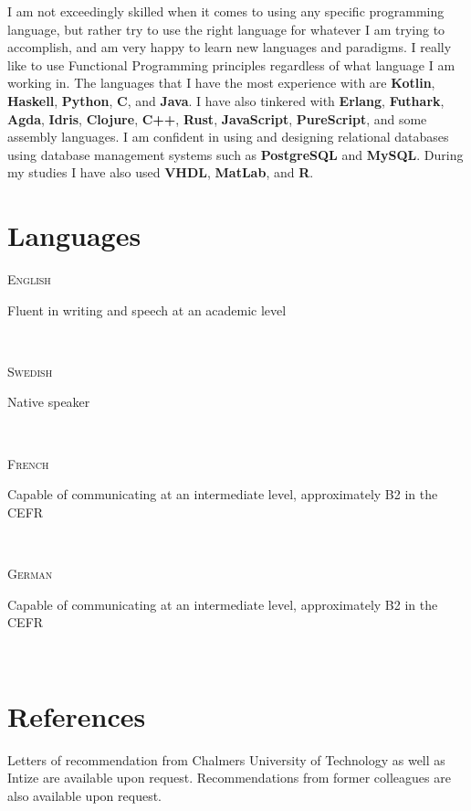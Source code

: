 \documentclass[letterpaper,
		10pt]{article}
\newcommand{\entry}[4]{
\ifthenelse{\isempty{#3}}
{\slimentry{#1}{#2}}{

\begin{minipage}[t]{.15\linewidth}
\hfill \textsc{#1}
\end{minipage}
\hfill\vline\hfill
\begin{minipage}[t]{.80\linewidth}
{\bf#2}\\\textit{#3} \small{#4}
\end{minipage}\\
\vspace{.2cm}
}}
\newcommand{\slimentry}[2]{
\begin{minipage}[t]{.15\linewidth}
\hfill \textsc{#1}
\end{minipage}
\hfill\vline\hfill
\begin{minipage}[t]{.80\linewidth}
#2
\end{minipage}\\
\vspace{.25cm}
}
\newcommand{\sentry}[2]{
\begin{minipage}[t]{.15\linewidth}
\hfill \textsc{#1}
\end{minipage}
\hfill\vline\hfill
\begin{minipage}[t]{.80\linewidth}
#2
\end{minipage}\\
\vspace{-.15cm}
}%
\begin{document}
I am not exceedingly skilled when it comes to using any specific programming language, but
rather try to use the right language for whatever I am trying to accomplish, and am very happy
to learn new languages and paradigms. I really like to use Functional Programming principles regardless of what
language I am working in. The languages that I have
the most experience with are \textbf{Kotlin}, \textbf{Haskell}, \textbf{Python}, \textbf{C}, and \textbf{Java}. I have also tinkered
with \textbf{Erlang}, \textbf{Futhark}, \textbf{Agda}, \textbf{Idris}, \textbf{Clojure}, \textbf{C++},
\textbf{Rust}, \textbf{JavaScript}, \textbf{PureScript}, and some assembly languages. I am
confident in using and designing relational databases using database management systems such as
\textbf{PostgreSQL} and \textbf{MySQL}. During my studies I have also used
\textbf{VHDL}, \textbf{MatLab}, and \textbf{R}.

\section{Languages}

\sentry{English}{Fluent in writing and speech at an academic level}

\sentry{Swedish}{Native speaker}

\sentry{French}{Capable of communicating at an intermediate level, approximately B2 in the CEFR}

\sentry{German}{Capable of communicating at an intermediate level, approximately B2 in the CEFR}

\section{References}
    
Letters of recommendation from Chalmers University of Technology as well as Intize are available upon request.
Recommendations from former colleagues are also available upon request.
\end{document}
